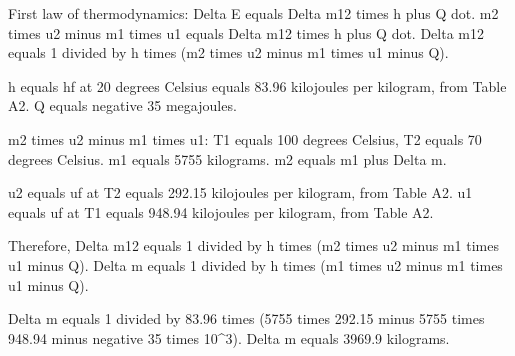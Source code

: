 First law of thermodynamics:  
Delta E equals Delta m12 times h plus Q dot.  
m2 times u2 minus m1 times u1 equals Delta m12 times h plus Q dot.  
Delta m12 equals 1 divided by h times (m2 times u2 minus m1 times u1 minus Q).  

h equals hf at 20 degrees Celsius equals 83.96 kilojoules per kilogram, from Table A2.  
Q equals negative 35 megajoules.  

m2 times u2 minus m1 times u1:  
T1 equals 100 degrees Celsius, T2 equals 70 degrees Celsius.  
m1 equals 5755 kilograms.  
m2 equals m1 plus Delta m.  

u2 equals uf at T2 equals 292.15 kilojoules per kilogram, from Table A2.  
u1 equals uf at T1 equals 948.94 kilojoules per kilogram, from Table A2.  

Therefore, Delta m12 equals 1 divided by h times (m2 times u2 minus m1 times u1 minus Q).  
Delta m equals 1 divided by h times (m1 times u2 minus m1 times u1 minus Q).  

Delta m equals 1 divided by 83.96 times (5755 times 292.15 minus 5755 times 948.94 minus negative 35 times 10^3).  
Delta m equals 3969.9 kilograms.